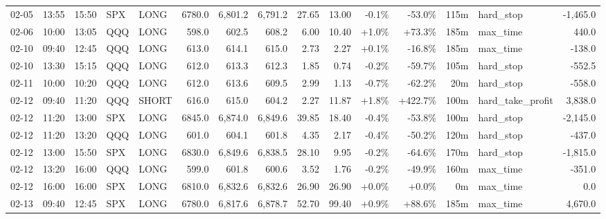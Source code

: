 \documentclass[11pt,a4paper,twoside]{article}
\begin{document}
\begin{landscape}
\begin{center}
\begin{longtable}{>{\color{txtmain}}l l l l l r r r r r r r r >{\color{txtmain}}l r}
02-05 & 13:55 & 15:50 & SPX & LONG & 6780.0 & 6,801.2 & 6,791.2 & 27.65 & 13.00 & \textcolor{lossred}{-0.1\%} & \textcolor{lossred}{-53.0\%} & 115m & hard\_stop & \textcolor{lossred}{-1,465.0} \\
02-06 & 10:00 & 13:05 & QQQ & LONG & 598.0 & 602.5 & 608.2 & 6.00 & 10.40 & \textcolor{wingreen}{+1.0\%} & \textcolor{wingreen}{+73.3\%} & 185m & max\_time & \textcolor{wingreen}{440.0} \\
02-10 & 09:40 & 12:45 & QQQ & LONG & 613.0 & 614.1 & 615.0 & 2.73 & 2.27 & \textcolor{wingreen}{+0.1\%} & \textcolor{lossred}{-16.8\%} & 185m & max\_time & \textcolor{lossred}{-138.0} \\
02-10 & 13:30 & 15:15 & QQQ & LONG & 612.0 & 613.3 & 612.3 & 1.85 & 0.74 & \textcolor{lossred}{-0.2\%} & \textcolor{lossred}{-59.7\%} & 105m & hard\_stop & \textcolor{lossred}{-552.5} \\
02-11 & 10:00 & 10:20 & QQQ & LONG & 612.0 & 613.6 & 609.5 & 2.99 & 1.13 & \textcolor{lossred}{-0.7\%} & \textcolor{lossred}{-62.2\%} & 20m & hard\_stop & \textcolor{lossred}{-558.0} \\
02-12 & 09:40 & 11:20 & QQQ & SHORT & 616.0 & 615.0 & 604.2 & 2.27 & 11.87 & \textcolor{wingreen}{+1.8\%} & \textcolor{wingreen}{+422.7\%} & 100m & hard\_take\_profit & \textcolor{wingreen}{3,838.0} \\
02-12 & 11:20 & 13:00 & SPX & LONG & 6845.0 & 6,874.0 & 6,849.6 & 39.85 & 18.40 & \textcolor{lossred}{-0.4\%} & \textcolor{lossred}{-53.8\%} & 100m & hard\_stop & \textcolor{lossred}{-2,145.0} \\
02-12 & 11:20 & 13:20 & QQQ & LONG & 601.0 & 604.1 & 601.8 & 4.35 & 2.17 & \textcolor{lossred}{-0.4\%} & \textcolor{lossred}{-50.2\%} & 120m & hard\_stop & \textcolor{lossred}{-437.0} \\
02-12 & 13:00 & 15:50 & SPX & LONG & 6830.0 & 6,849.6 & 6,838.5 & 28.10 & 9.95 & \textcolor{lossred}{-0.2\%} & \textcolor{lossred}{-64.6\%} & 170m & hard\_stop & \textcolor{lossred}{-1,815.0} \\
02-12 & 13:20 & 16:00 & QQQ & LONG & 599.0 & 601.8 & 600.6 & 3.52 & 1.76 & \textcolor{lossred}{-0.2\%} & \textcolor{lossred}{-49.9\%} & 160m & max\_time & \textcolor{lossred}{-351.0} \\
02-12 & 16:00 & 16:00 & SPX & LONG & 6810.0 & 6,832.6 & 6,832.6 & 26.90 & 26.90 & \textcolor{wingreen}{+0.0\%} & \textcolor{wingreen}{+0.0\%} & 0m & max\_time & \textcolor{wingreen}{0.0} \\
02-13 & 09:40 & 12:45 & SPX & LONG & 6780.0 & 6,817.6 & 6,878.7 & 52.70 & 99.40 & \textcolor{wingreen}{+0.9\%} & \textcolor{wingreen}{+88.6\%} & 185m & max\_time & \textcolor{wingreen}{4,670.0} \\

\end{longtable}
\end{center}
\end{landscape}
\end{document}
